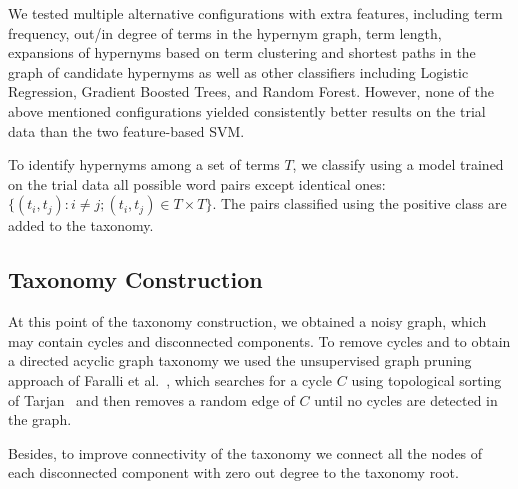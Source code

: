 \documentclass[11pt,letterpaper]{article}
\begin{document}
We tested multiple alternative configurations with extra features, including term frequency, out/in degree of terms in the hypernym graph, term length, expansions of hypernyms based on term clustering and shortest paths in the graph of candidate hypernyms as well as other classifiers including Logistic Regression, Gradient Boosted Trees, and Random Forest. However, none of the above mentioned configurations yielded consistently better results on the trial data than the two feature-based SVM.

To identify hypernyms among a  set of terms $T$, we classify using a model trained on the trial data all possible word pairs except identical ones:  $\{(t_i, t_j): i \neq j; (t_i, t_j) \in T \times T \}$. The pairs classified using the positive class are added to the taxonomy.  

\subsection{Taxonomy Construction}
At this point of the taxonomy construction, we obtained a noisy graph, which may contain cycles and  disconnected components. To remove cycles and to obtain a directed acyclic graph taxonomy we used the unsupervised graph pruning approach of Faralli et al.~, which searches for a cycle $C$ using topological sorting of Tarjan~ and then removes a random edge of $C$ until no cycles are detected in the graph. 

Besides, to improve connectivity of the taxonomy we connect all the nodes of each disconnected component with zero out degree to the taxonomy root. 
\end{document}
